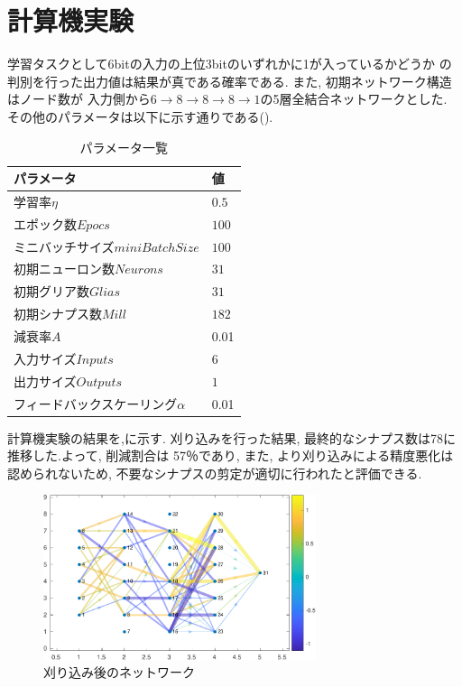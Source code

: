 \documentclass[a4paper,9pt,twocolumn]{jsarticle}
\begin{document}
\section{計算機実験}
学習タスクとして6bitの入力の上位3bitのいずれかに1が入っているかどうか
の判別を行った出力値は結果が真である確率である. 
また, 初期ネットワーク構造はノード数が
入力側から$6\rightarrow 8\rightarrow 8\rightarrow 8\rightarrow 1$の5層全結合ネットワークとした.
その他のパラメータは以下に示す通りである().
\begin{table}[H]
  \caption{パラメータ一覧}
  \label{tab:param}
  \centering
   \begin{tabular}{ll}
    \toprule
      パラメータ&値\\\midrule\midrule
      学習率$\eta$&$0.5$\\
      エポック数$Epocs$&$100$\\
      ミニバッチサイズ$miniBatchSize$&$100$\\
      初期ニューロン数$Neurons$&$31$\\
      初期グリア数$Glias$&$31$\\
      初期シナプス数$Mill$&$182$\\
      減衰率$A$&0.01\\
      入力サイズ$Inputs$&$6$\\
      出力サイズ$Outputs$&$1$\\
      フィードバックスケーリング$\alpha$&0.01\\
    \bottomrule
   \end{tabular}
 \end{table}
計算機実験の結果を,に示す.
刈り込みを行った結果, 最終的なシナプス数は78に推移した.よって, 削減割合は
57％であり, また, より刈り込みによる精度悪化は認められないため, 
不要なシナプスの剪定が適切に行われたと評価できる.
\begin{figure}[H]
  \centering
  \includegraphics[width=8cm]{Graph-crop.pdf} 
  \caption{刈り込み後のネットワーク}
  \label{fig:Graph}
\end{figure}
\end{document}
